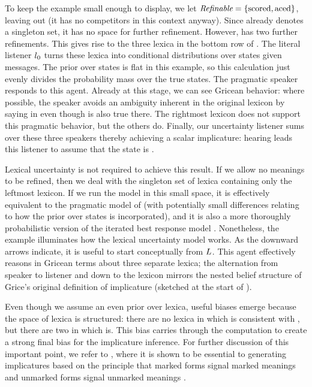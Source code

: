 \documentclass[leqno]{article}
\begin{document}
To keep the example small enough to display, we let $\textit{Refinable} =
\left\{ \text{scored}, \text{aced} \right\}$, leaving  out (it has
no competitors in this context anyway). Since  already
denotes a singleton set, it has no space for further refinement.
However,  has two further refinements.  This gives rise
to the three lexica in the bottom row of
. The literal listener $l_{0}$ turns
these lexica into conditional distributions over states given
messages.  The prior over states is flat in this example, so this
calculation just evenly divides the probability mass over the true
states. The pragmatic speaker responds to this agent. Already at this
stage, we can see Gricean behavior: where possible, the speaker avoids
an ambiguity inherent in the original lexicon by saying  in  even though  is also true
there. The rightmost lexicon does not support this pragmatic behavior,
but the others do. Finally, our uncertainty listener sums over these
three speakers thereby achieving a scalar implicature: hearing
 leads this listener to assume that the state is
.

Lexical uncertainty is not required to achieve this result. If we
allow no meanings to be refined, then we deal with the singleton set
of lexica containing only the leftmost lexicon. If we run the model in
this small space, it is effectively equivalent to the pragmatic model
of \citet{Frank:Goodman:2012} (with potentially small differences
relating to how the prior over states is incorporated), and it is also
a more thoroughly probabilistic version of the iterated best response
model \citep{Franke09DISS,Jaeger:2007,Jaeger:2011}. Nonetheless, the
example illuminates how the lexical uncertainty model works. As the
downward arrows indicate, it is useful to start conceptually from
$L$. This agent effectively reasons in Gricean
terms about three separate lexica; the alternation from speaker to
listener and down to the lexicon mirrors the nested belief structure
of Grice's original definition of implicature (sketched at the start
of ).

Even though we assume an even prior over lexica, useful biases emerge
because the space of lexica is structured: there are no lexica in
which  is consistent with , but there are two in
which  is. This bias carries through the computation to
create a strong final bias for the implicature inference. For further
discussion of this important point, we refer to
\citet{Bergen:Levy:Goodman:2014}, where it is shown to be essential to
generating implicatures based on the principle that marked forms
signal marked meanings and unmarked forms signal unmarked meanings
\citep{McCawley78,Horn84,Blutner98,Levinson00}.
\end{document}
